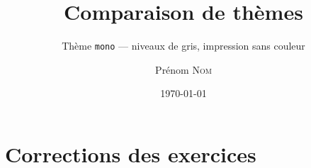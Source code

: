 \documentclass[11pt]{ocots-book}
\title{Comparaison de thèmes}
\subtitle{Thème \texttt{mono} — niveaux de gris, impression sans couleur}
\author{Prénom \textsc{Nom}}
\date{\today}
\begin{document}
\maketitle

\ocotscollectsolutions%





\chapter{Corrections des exercices}
\ocotsprintsolutions%



\end{document}
